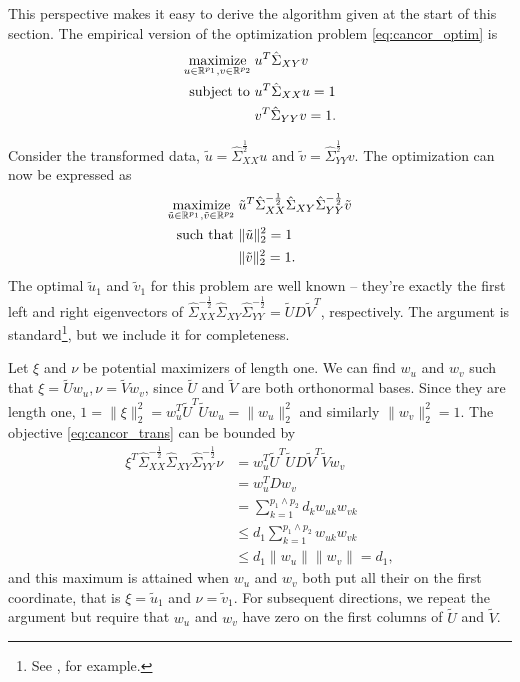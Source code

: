 \documentclass{article}
\begin{document}
This perspective makes it easy to derive the algorithm given at the start of
this section. The empirical version of the optimization problem
\ref{eq:cancor_optim} is
\begin{align}
  \mathop\mathrm{maximize}_{u \in \mathbb{R}^{p_{1}}, v \in \mathbb{R}^{p_{2}}}\medspace
  &u^{T}\hat{\Sigma}_{XY}v \label{eq:cancor_optim_emp}\\
  \text{subject to } & u^{T}\hat{\Sigma}_{XX}u = 1 \nonumber \\
  & v^{T}\hat{\Sigma}_{YY}v = 1. \nonumber
\end{align}

Consider the transformed data, $\tilde{u} = \hat{\Sigma}_{XX}^{\frac{1}{2}}u$
and $\tilde{v} = \hat{\Sigma}_{YY}^{\frac{1}{2}}v$. The
optimization \label{eq:cancor_emp} can now be expressed as
\begin{align}
  \mathop\mathrm{maximize}_{\tilde{u} \in \mathbb{R}^{p_{1}}, \tilde{v} \in \mathbb{R}^{p_{2}}}\medspace
    &\tilde{u}^{T}\hat{\Sigma}_{XX}^{-\frac{1}{2}}\hat{\Sigma}_{XY}\hat{\Sigma}_{YY}^{-\frac{1}{2}}\tilde{v} \label{eq:cancor_trans} \\
    \text{such that } & \|\tilde{u}\|^{2}_{2} = 1 \nonumber \\
    &\|\tilde{v}\|_{2}^{2} = 1. \nonumber
\end{align}
The optimal $\tilde{u}_1$ and $\tilde{v}_1$ for this problem are
well known -- they're exactly the first left and right eigenvectors of
$\hat{\Sigma}_{XX}^{-\frac{1}{2}}\hat{\Sigma}_{XY}\hat{\Sigma}_{YY}^{-\frac{1}{2}}
= \tilde{U}D\tilde{V}^{T}$, respectively. The argument is standard\footnote{See
  \citep{mardia1980multivariate}, for example.}, but we include it for
completeness.

Let $\xi$ and $\nu$ be potential maximizers of length one. We can find $w_{u}$
and $w_{v}$ such that $\xi = \tilde{U}w_{u}, \nu = \tilde{V}w_{v}$, since
$\tilde{U}$ and $\tilde{V}$ are both orthonormal bases. Since they are length
one, $1 = \|\xi\|^{2}_{2} = w_{u}^{T}\tilde{U}^{T}\tilde{U}w_{u} =
\|w_{u}\|_{2}^{2}$ and similarly $\|w_{v}\|_{2}^{2} = 1$. The objective
\ref{eq:cancor_trans} can be bounded by
\begin{align*}
\xi^{T}\hat{\Sigma}_{XX}^{-\frac{1}{2}}\hat{\Sigma}_{XY}\hat{\Sigma}_{YY}^{-\frac{1}{2}}\nu
&= w_{u}^{T}\tilde{U}^{T}\tilde{U}D\tilde{V}^{T}\tilde{V}w_{v} \\
&= w_{u}^{T}Dw_{v} \\
&= \sum_{k = 1}^{p_{1} \wedge p_{2}} d_{k}w_{uk}w_{vk} \\
&\leq d_{1} \sum_{k = 1}^{p_{1} \wedge p_{2}} w_{uk}w_{vk} \\
&\leq d_{1} \|w_{u}\|\|w_{v}\| = d_{1},
\end{align*}
and this maximum is attained when $w_{u}$ and $w_{v}$ both put all their
on the first coordinate, that is $\xi = \tilde{u}_{1}$ and $\nu =
\tilde{v}_{1}$. For subsequent directions, we repeat the argument but require
that $w_{u}$ and $w_{v}$ have zero  on the first columns of $\tilde{U}$
and $\tilde{V}$.
\end{document}
